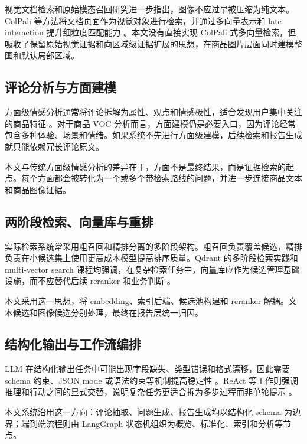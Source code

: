 \documentclass[11pt]{article}
\begin{document}
视觉文档检索和原始模态召回研究进一步指出，图像不应过早被压缩为纯文本。ColPali 等方法将文档页面作为视觉对象进行检索，并通过多向量表示和 late interaction 提升细粒度匹配能力 \citep{faysse2024colpali}。本文没有直接实现 ColPali 式多向量检索，但吸收了保留原始视觉证据和向区域级证据扩展的思想，在商品图片层面同时建模整图和默认局部区域。

\subsection{评论分析与方面建模}

方面级情感分析通常将评论拆解为属性、观点和情感极性，适合发现用户集中关注的商品特征 \citep{pontiki2014semevalAspect}。对于商品 VOC 分析而言，方面建模仍是必要入口，因为评论经常包含多种体验、场景和情绪。如果系统不先进行方面级建模，后续检索和报告生成就只能依赖冗长评论原文。

本文与传统方面级情感分析的差异在于，方面不是最终结果，而是证据检索的起点。每个方面都会被转化为一个或多个带检索路线的问题，并进一步连接商品文本和商品图像证据。

\subsection{两阶段检索、向量库与重排}

实际检索系统常采用粗召回和精排分离的多阶段架构。粗召回负责覆盖候选，精排负责在小候选集上使用更高成本模型提高排序质量。Qdrant 的多阶段检索实践和 multi-vector search 课程均强调，在复杂检索任务中，向量库应作为候选管理基础设施，而不应替代后续 reranker 和业务判断 \citep{qdrant2024pdfRetrievalAtScale,qdrant2024multiVectorCourse}。

本文采用这一思想，将 embedding、索引后端、候选池构建和 reranker 解耦。文本候选和图像候选分别处理，最终在报告层统一归因。

\subsection{结构化输出与工作流编排}

LLM 在结构化输出任务中可能出现字段缺失、类型错误和格式漂移，因此需要 schema 约束、JSON mode 或语法约束等机制提高稳定性 \citep{liu2024structuredOutputBenchmark,geng2023grammarConstrainedDecoding}。ReAct 等工作则强调推理和行动之间的显式交替，说明复杂任务更适合拆为多步过程而非单轮提示 \citep{yao2023react}。

本文系统沿用这一方向：评论抽取、问题生成、报告生成均以结构化 schema 为边界；端到端流程则由 LangGraph 状态机组织为概览、标准化、索引和分析等节点。
\end{document}
